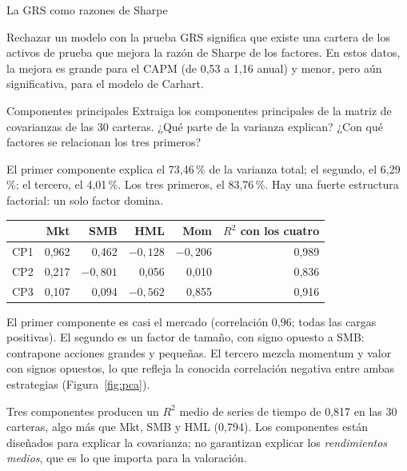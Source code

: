 \begin{ejresuelto}{La GRS como razones de Sharpe}
\begin{conclusion}
Rechazar un modelo con la prueba GRS significa que existe una cartera de los activos de prueba que mejora la razón de
Sharpe de los factores. En estos datos, la mejora es grande para el CAPM (de 0,53 a 1,16 anual) y menor, pero aún
significativa, para el modelo de Carhart.
\end{conclusion}
\end{ejresuelto}

\begin{ejresuelto}{Componentes principales}\label{ej:pca}
\enunciado Extraiga los componentes principales de la matriz de covarianzas de las 30 carteras. ¿Qué parte de la varianza
explican? ¿Con qué factores se relacionan los tres primeros?

\solucion
{} El primer componente explica el 73,46\,\% de la varianza total; el segundo, el 6,29\,\%; el
tercero, el 4,01\,\%. Los tres primeros, el 83,76\,\%. Hay una fuerte estructura factorial: un solo factor domina.

\begin{center}\small
\begin{tabular}{@{}lrrrrr@{}}
\toprule
 & Mkt & SMB & HML & Mom & $R^2$ con los cuatro \\
\midrule
CP1 & 0,962 & 0,462 & $-0{,}128$ & $-0{,}206$ & 0,989 \\
CP2 & 0,217 & $-0{,}801$ & 0,056 & 0,010 & 0,836 \\
CP3 & 0,107 & 0,094 & $-0{,}562$ & 0,855 & 0,916 \\
\bottomrule
\end{tabular}
\end{center}
El primer componente es casi el mercado (correlación 0,96; todas las cargas positivas). El segundo es un factor de tamaño,
con signo opuesto a SMB: contrapone acciones grandes y pequeñas. El tercero mezcla momentum y valor con signos opuestos, lo
que refleja la conocida correlación negativa entre ambas estrategias (Figura~\ref{fig:pca}).

 Tres componentes producen un $R^2$ medio de series de tiempo de 0,817 en las 30 carteras, algo más que
Mkt, SMB y HML (0,794). Los componentes están diseñados para explicar la covarianza; no garantizan explicar los
\emph{rendimientos medios}, que es lo que importa para la valoración.



\end{ejresuelto}

